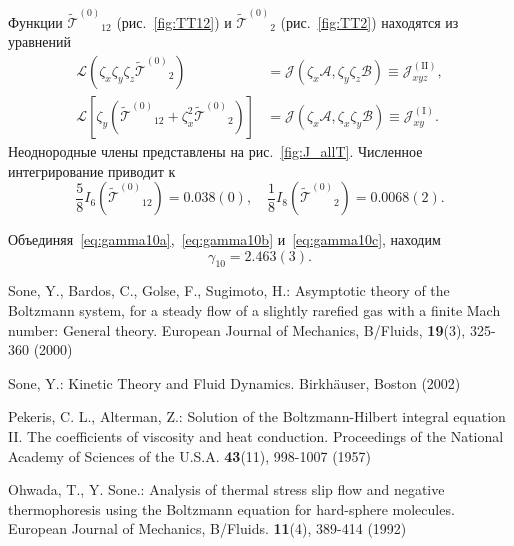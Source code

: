 \documentclass[a4paper,12pt]{article}
\newcommand{\TT}{\ensuremath{\tilde{\mathcal{T}}^{(0)}}}
\begin{document}
Функции \(\TT_{12}\) (рис.~\ref{fig:TT12}) и \(\TT_2\) (рис.~\ref{fig:TT2}) находятся из уравнений
\begin{align}
    \mathcal{L}\left( \zeta_x\zeta_y\zeta_z\TT_2 \right)
    	&= \mathcal{J}\left( \zeta_x\mathcal{A}, \zeta_y\zeta_z\mathcal{B} \right) \equiv \mathcal{J}_{xyz}^{(\mathrm{II})}, \label{eq:TT2}\\
    \mathcal{L}\left[ \zeta_y\left(\TT_{12} + \zeta_x^2\TT_2\right) \right]
        &= \mathcal{J}\left( \zeta_x\mathcal{A}, \zeta_x\zeta_y\mathcal{B} \right) \equiv \mathcal{J}_{xy}^{(\mathrm{I})}. \label{eq:TT12}
\end{align}
Неоднородные члены представлены на рис.~\ref{fig:J_allT}.
Численное интегрирование приводит к
\begin{equation}\label{eq:gamma10c}
    \frac58 I_6\left(\TT_{12}\right) = 0.038(0), \quad \frac18 I_8\left(\TT_2\right) = 0.0068(2).
\end{equation}

Объединяя~\eqref{eq:gamma10a},~\eqref{eq:gamma10b} и~\eqref{eq:gamma10c}, находим
\begin{equation}\label{eq:gamma_10_result}
    \gamma_{10} = 2.463(3).
\end{equation}

\begin{thebibliography}{9}

    Sone, Y., Bardos, C., Golse, F., Sugimoto, H.:
    Asymptotic theory of the Boltzmann system, for a steady flow of a slightly rarefied gas
    with a finite Mach number: General theory.
    \newblock European Journal of Mechanics, B/Fluids, \textbf{19}(3), 325-360 (2000)

    Sone, Y.: Kinetic Theory and Fluid Dynamics.
    \newblock Birkh{\"a}user, Boston (2002)

    Pekeris, C. L., Alterman, Z.: Solution of the Boltzmann-Hilbert integral equation II.
    The coefficients of viscosity and heat conduction.
    \newblock Proceedings of the National Academy of Sciences of the U.S.A. \textbf{43}(11), 998-1007 (1957)

    Ohwada, T., Y. Sone.: Analysis of thermal stress slip flow and negative thermophoresis
    using the Boltzmann equation for hard-sphere molecules.
    \newblock European Journal of Mechanics, B/Fluids. \textbf{11}(4), 389-414 (1992)

\end{thebibliography}
\end{document}
